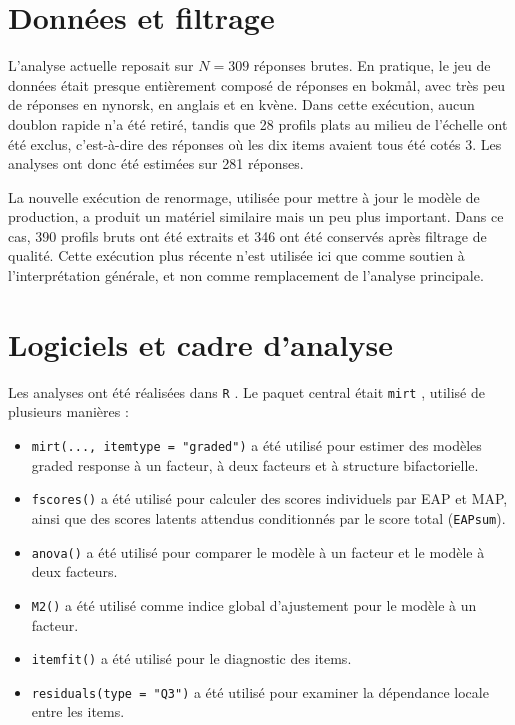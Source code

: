 \documentclass[11pt,a4paper]{article}
\begin{document}
\section{Données et filtrage}
L’analyse actuelle reposait sur $N = 309$ réponses brutes. En pratique, le jeu de données était presque entièrement composé de réponses en bokmål, avec très peu de réponses en nynorsk, en anglais et en kvène. Dans cette exécution, aucun doublon rapide n’a été retiré, tandis que 28 profils plats au milieu de l’échelle ont été exclus, c’est-à-dire des réponses où les dix items avaient tous été cotés 3. Les analyses ont donc été estimées sur 281 réponses.

La nouvelle exécution de renormage, utilisée pour mettre à jour le modèle de production, a produit un matériel similaire mais un peu plus important. Dans ce cas, 390 profils bruts ont été extraits et 346 ont été conservés après filtrage de qualité. Cette exécution plus récente n’est utilisée ici que comme soutien à l’interprétation générale, et non comme remplacement de l’analyse principale.

\section{Logiciels et cadre d’analyse}
Les analyses ont été réalisées dans \texttt{R} \parencite{RCore2026}. Le paquet central était \texttt{mirt} \parencite{Chalmers2012mirt}, utilisé de plusieurs manières :

\begin{itemize}
\item \texttt{mirt(..., itemtype = "graded")} a été utilisé pour estimer des modèles graded response à un facteur, à deux facteurs et à structure bifactorielle.
\item \texttt{fscores()} a été utilisé pour calculer des scores individuels par EAP et MAP, ainsi que des scores latents attendus conditionnés par le score total (\texttt{EAPsum}).
\item \texttt{anova()} a été utilisé pour comparer le modèle à un facteur et le modèle à deux facteurs.
\item \texttt{M2()} a été utilisé comme indice global d’ajustement pour le modèle à un facteur.
\item \texttt{itemfit()} a été utilisé pour le diagnostic des items.
\item \texttt{residuals(type = "Q3")} a été utilisé pour examiner la dépendance locale entre les items.
\end{itemize}
\end{document}
